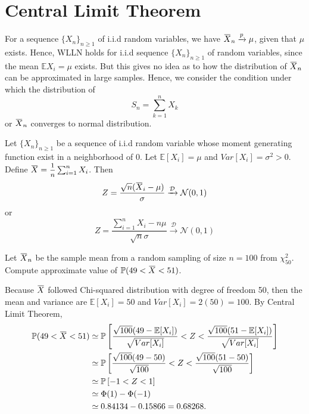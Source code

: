 \section{Central Limit Theorem}

For a sequence $\{X_n\}_{n \geq 1}$ of i.i.d random variables, we have 
$\ols{X}_n \xrightarrow[]{p} \mu$, given that $\mu$ exists. Hence, 
WLLN holds for i.i.d sequence $\{X_n\}_{n \geq 1}$ of random variables, since 
the mean $\mathbb{E} X_i = \mu$ exists. But this gives no idea as to how 
the distribution of $\ols{X}_n$ can be approximated in large samples. Hence, we consider the 
condition under which the distribution of 
\[
    S_n = \sum^n_{k=1} X_k
\]
or $\ols{X}_n$ converges to normal distribution.

\begin{theorem}
    Let $\{X_n\}_{n \geq 1}$ be a sequence of i.i.d random variable whose moment generating function 
    exist in a neighborhood of 0. Let $\mathbb{E}[X_i] = \mu$ and $Var[X_i] = \sigma^2 > 0$. Define
    $\ols{X} = \mfrac{1}{n} \sum^n_{i=1} X_i$. Then 
    \begin{equation}
        Z = \frac{\sqrt{n} (\ols{X}_i - \mu)}{\sigma} \xrightarrow[]{\mathcal{D}} \mathcal{N}(0,1)
    \end{equation}
    or 
    \begin{equation}
        Z = \frac{\sum^n_{i=1} X_i - n\mu}{\sqrt{n} \sigma} \xrightarrow[]{\mathcal{D}} \mathcal{N}(0,1)
    \end{equation}
\end{theorem}

\begin{example}
    Let $\ols{X}_n$ be the sample mean from a random sampling of size 
    $n = 100$ from $\chi^2_{50}$. Compute approximate value of 
    $\mathbb{P}(49 < \ols{X} < 51)$.
\end{example}
\begin{solution}
    Because $\ols{X}$ followed Chi-squared distribution with degree of freedom 50, then the mean and variance are 
    $\mathbb{E}[X_i] = 50$ and $Var[X_i] = 2(50) = 100$. By Central Limit Theorem, 
    \begin{align*}
        \mathbb{P}(49 < \ols{X} < 51) &\simeq  
        \mathbb{P} \left[ \frac{\sqrt{100} (49 - \mathbb{E}[X_i])}{\sqrt{Var[X_i]}} < Z < \frac{\sqrt{100} (51 - \mathbb{E}[X_i])}{\sqrt{Var[X_i]}} \right]\\
        &\simeq \mathbb{P} \left[ \frac{\sqrt{100} (49 - 50)}{\sqrt{100}} < Z < \frac{\sqrt{100} (51 - 50)}{\sqrt{100}} \right]\\
        &\simeq \mathbb{P} \left[ -1 < Z < 1 \right]\\
        &\simeq \Phi(1) - \Phi(-1)\\
        &\simeq 0.84134 - 0.15866 = 0.68268.
    \end{align*} 
\end{solution}

